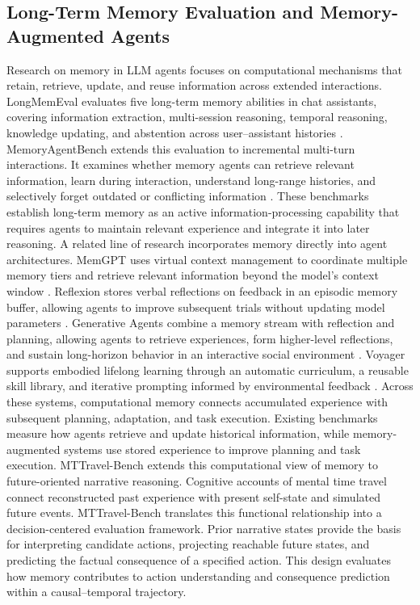 \documentclass[pdflatex,sn-mathphys-num]{sn-jnl}%
\theoremstyle{thmstyleone}%
\theoremstyle{thmstyletwo}%
\theoremstyle{thmstylethree}%
\begin{document}
\subsection{Long-Term Memory Evaluation and Memory-Augmented Agents}
Research on memory in LLM agents focuses on computational mechanisms that retain, retrieve, update, and reuse information across extended interactions. LongMemEval evaluates five long-term memory abilities in chat assistants, covering information extraction, multi-session reasoning, temporal reasoning, knowledge updating, and abstention across user--assistant histories \cite{wu2024longmemeval}. MemoryAgentBench extends this evaluation to incremental multi-turn interactions. It examines whether memory agents can retrieve relevant information, learn during interaction, understand long-range histories, and selectively forget outdated or conflicting information \cite{hu2025evaluating}. These benchmarks establish long-term memory as an active information-processing capability that requires agents to maintain relevant experience and integrate it into later reasoning.
A related line of research incorporates memory directly into agent architectures. MemGPT uses virtual context management to coordinate multiple memory tiers and retrieve relevant information beyond the model's context window \cite{packer2023memgpt}. Reflexion stores verbal reflections on feedback in an episodic memory buffer, allowing agents to improve subsequent trials without updating model parameters \cite{shinn2023reflexion}. Generative Agents combine a memory stream with reflection and planning, allowing agents to retrieve experiences, form higher-level reflections, and sustain long-horizon behavior in an interactive social environment \cite{park2023generative}. Voyager supports embodied lifelong learning through an automatic curriculum, a reusable skill library, and iterative prompting informed by environmental feedback \cite{wang2023voyager}. Across these systems, computational memory connects accumulated experience with subsequent planning, adaptation, and task execution.
Existing benchmarks measure how agents retrieve and update historical information, while memory-augmented systems use stored experience to improve planning and task execution. MTTravel-Bench extends this computational view of memory to future-oriented narrative reasoning. Cognitive accounts of mental time travel connect reconstructed past experience with present self-state and simulated future events. MTTravel-Bench translates this functional relationship into a decision-centered evaluation framework. Prior narrative states provide the basis for interpreting candidate actions, projecting reachable future states, and predicting the factual consequence of a specified action. This design evaluates how memory contributes to action understanding and consequence prediction within a causal--temporal trajectory.
\end{document}
